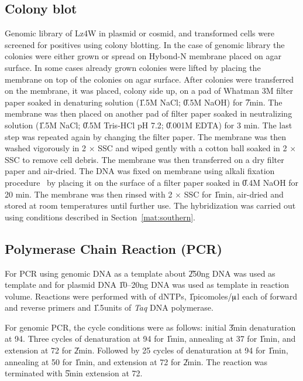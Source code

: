 \subsection{Colony blot}
\label{colony-blot}

Genomic library of Lz4W in plasmid or cosmid, and transformed
cells were screened for positives using colony blotting. In the
case of genomic library the colonies were either grown or spread
on Hybond\texttrademark-N\su{$+$} membrane placed on agar surface.
In some cases already grown colonies were lifted by placing the
membrane on top of the colonies on agar surface. After colonies
were transferred on the membrane, it was placed, colony side up,
on a pad of Whatman 3M filter paper soaked in denaturing solution
(\U{1.5}{M} NaCl; \U{0.5}{M} NaOH) for \U{7}{min}. The membrane
was then placed on another pad of filter paper soaked in
neutralizing solution (\U{1.5}{M} NaCl; \U{0.5}{M} Tris-HCl pH
7.2; \U{0.001}{M} EDTA) for 3 min. The last step was repeated
again by changing the filter paper. The membrane was then washed
vigorously in 2 $\times$ SSC and wiped gently with a cotton ball
soaked in 2 $\times$ SSC to remove cell debris. The membrane was
then transferred on a dry filter paper and air-dried. The DNA was
fixed on membrane using alkali fixation procedure~\citep{Reed1985}
by placing it on the surface of a filter paper soaked in
\U{0.4}{M} NaOH for 20 min. The membrane was then rinsed with 2
$\times$ SSC for \U{1}{min}, air-dried and stored at room
temperatures until further use. The hybridization was carried out
using conditions described in Section~\ref{mat:southern}.



\subsection{Polymerase Chain Reaction (PCR)}

For PCR using genomic DNA as a template about \U{250}{ng} DNA was
used as template and for plasmid DNA \U{10--20}{ng} DNA was used
as template in  reaction volume. Reactions were
performed with  of dNTPs, \U{1}{picomoles/$\muup$l} each
of forward and reverse primers and \U{1.5}{units} of \emph{Taq}
DNA polymerase.

For genomic PCR, the cycle conditions were as follows: initial
\U{3}{min} denaturation at 94\dg{}. Three cycles of denaturation
at 94\dg{} for \U{1}{min}, annealing at 37\dg{} for \U{1}{min},
and extension at 72\dg{} for \U{2}{min}. Followed by 25 cycles of
denaturation at 94\dg{} for \U{1}{min}, annealing at 50\dg{} for
\U{1}{min}, and extension at 72\dg{} for \U{2}{min}. The reaction
was terminated with \U{5}{min} extension at 72\dg.

